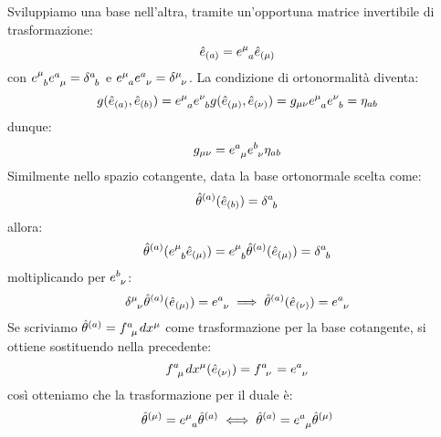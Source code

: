 Sviluppiamo una base nell'altra, tramite un'opportuna matrice invertibile di trasformazione:
\begin{equation}
    \hat{e}_{(a)} = \tensor{e}{^\mu_a}\hat{e}_{(\mu)}
    \label{eq.trasform_base_tang_indici_abstr}
\end{equation}
con $\tensor{e}{^\mu_b}\tensor{e}{^a_\mu} = \tensor{\delta}{^a_b}$ e $\tensor{e}{^\mu_a}\tensor{e}{^a_\nu} = \tensor{\delta}{^\mu_\nu}$.
La condizione di ortonormalità diventa:
\begin{equation*}
       g(\hat{e}_{(a)}, \hat{e}_{(b)})=  \tensor{e}{^\mu_a}\tensor{e}{^\nu_b} g( \hat{e}_{(\mu)}, \hat{e}_{(\nu)}) = g_{\mu\nu}\tensor{e}{^\mu_a}\tensor{e}{^\nu_b} = \eta_{ab}
\end{equation*}
dunque:
\begin{equation*}
    g_{\mu\nu} = \tensor{e}{^a_\mu} \tensor{e}{^b_\nu} \eta_{ab}
\end{equation*}
Similmente nello spazio cotangente, data la base ortonormale scelta come:
\begin{equation*}
    \hat{\theta}^{(a)}(\hat{e}_{(b)}) = \tensor{\delta}{^a_b}
\end{equation*}
allora:
\begin{equation*}
    \hat{\theta}^{(a)}(\tensor{e}{^\mu_b}\hat{e}_{(\mu)}) = \tensor{e}{^\mu_b} \hat{\theta}^{(a)}(\hat{e}_{(\mu)}) = \tensor{\delta}{^a_b} 
\end{equation*}
moltiplicando per $\tensor{e}{^b_\nu}$:
\begin{equation*}
    \tensor{\delta}{^\mu_\nu}\hat{\theta}^{(a)}(\hat{e}_{(\mu)}) = \tensor{e}{^a_\nu} \implies \hat{\theta}^{(a)}(\hat{e}_{(\nu)}) = \tensor{e}{^a_\nu}
\end{equation*}
Se scriviamo $\hat{\theta}^{(a)} = \tensor{f}{^a_\mu}dx^\mu$ come trasformazione per la base cotangente, si ottiene sostituendo nella precedente:
\begin{equation*}
    \tensor{f}{^a_\mu} dx^\mu( \hat{e}_{(\nu)}) = \tensor{f}{^a_\nu} = \tensor{e}{^a_\nu}
\end{equation*}
così otteniamo che la trasformazione per il duale è:
\begin{equation}
    \hat{\theta}^{(\mu)} = \tensor{e}{^\mu_a}\hat{\theta}^{(a)} \iff \hat{\theta}^{(a)} = \tensor{e}{^a_\mu} \hat{\theta}^{(\mu)}
    \label{eq.trasform_base_cotang_indici_abstr}
\end{equation}
